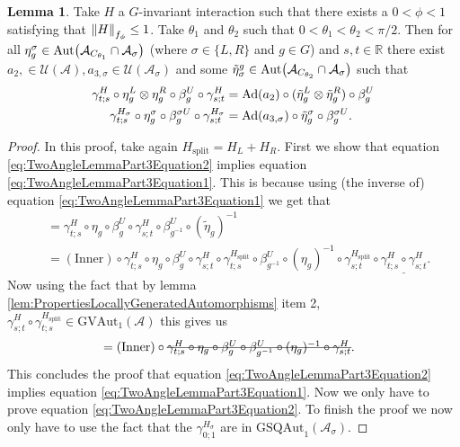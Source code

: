 \documentclass[12pt,a4paper,twoside]{article}
\newcommand{\stkout}[1]{\ifmmode\text{\sout{\ensuremath{#1}}}\else\sout{#1}\fi}
\newcommand{\Hsplit}{{H_{\text{split}}}}
\let\originalleft\left
\let\originalright\right
\renewcommand{\left}{\mathopen{}\mathclose\bgroup\originalleft}
\renewcommand{\right}{\aftergroup\egroup\originalright}
\newcommand{\UU}{\mathcal U}
\renewcommand{\AA}{\mathcal A}
\newcommand{\RR}{\mathbb R}
\newcommand{\Ad}[1]{\textrm{Ad}\left(#1\right)}
\newcommand{\Aut}[1]{\textrm{Aut}\left(#1\right)}
\theoremstyle{definition}
\newtheorem{lemma}[theorem]{Lemma}
\numberwithin{equation}{section}
\begin{document}
\begin{lemma}\label{lem:TwoAngleLemmaPart3}
	Take $H$ a $G$-invariant interaction such that there exists a $0<\phi<1$ satisfying that $\norm{H}_{f_\phi}\leq 1$. Take $\theta_1$ and $\theta_2$ such that $0<\theta_1<\theta_2<\pi/2$. Then for all $\eta_{g}^{\sigma}\in\Aut{\AA_{C_{\theta_1}}\cap\AA_{\sigma}}$ (where $\sigma\in\{L,R\}$ and $g\in G$) and $s,t\in\RR$ there exist $a_{2},\in\UU(\AA),a_{3,\sigma}\in\UU(\AA_\sigma)$ and some $\tilde{\eta}_{\sigma}^g\in \Aut{\AA_{C_{\theta_2}}\cap\AA_{\sigma}}$ such that
	\begin{align}
		\label{eq:TwoAngleLemmaPart3Equation1}
		\gamma^{H}_{t;s}\circ\eta_{g}^L\otimes\eta_{g}^R\circ\beta_g^U\circ\gamma^{H}_{s;t}&=\Ad{a_2}\circ(\tilde\eta_{g}^L \otimes\tilde\eta_{g}^R)\circ\beta_g^U\\
		\label{eq:TwoAngleLemmaPart3Equation2}
		\gamma^{H_\sigma}_{t;s}\circ\eta_g^\sigma\circ\beta_g^{\sigma U}\circ\gamma^{H_\sigma}_{s;t}&=\Ad{a_{3,\sigma}}\circ \tilde\eta_{g}^\sigma\circ\beta_g^{\sigma U}.
	\end{align}
\end{lemma}
\begin{proof}
	In this proof, take again $H_{\text{split}}=H_L+H_R$. First we show that equation \eqref{eq:TwoAngleLemmaPart3Equation2} implies equation \eqref{eq:TwoAngleLemmaPart3Equation1}. This is because using (the inverse of) equation \eqref{eq:TwoAngleLemmaPart3Equation1} we get that
	\begin{align}
		&=\gamma^H_{t;s}\circ\eta_g\circ\beta_g^U\circ\gamma^H_{s;t}\circ\beta_{g^{-1}}^U\circ(\tilde{\eta}_g)^{-1}\\
		&=(\text{Inner})\circ \gamma^H_{t;s}\circ\eta_g\circ\beta_g^U\circ\gamma^H_{s;t}\circ\gamma^\Hsplit_{t;s}\circ\beta_{g^{-1}}^U\circ(\eta_g)^{-1}\circ\gamma^\Hsplit_{s;t}\circ\underline{\gamma^H_{t;s}\circ\gamma^H_{s;t}}.
	\end{align}
	Now using the fact that by lemma \ref{lem:PropertiesLocallyGeneratedAutomorphisms} item 2, $\gamma^H_{s;t}\circ\gamma^\Hsplit_{t;s}\in\textrm{GVAut}_1(\AA)$ this gives us
	\begin{align}
		&=(\text{Inner})\circ\stkout{\gamma^H_{t;s}\circ\eta_g\circ\beta_g^U\circ\beta_{g^{-1}}^U\circ(\eta_g)^{-1}\circ\gamma^H_{s;t}}.
	\end{align}
	This concludes the proof that equation \eqref{eq:TwoAngleLemmaPart3Equation2} implies equation \eqref{eq:TwoAngleLemmaPart3Equation1}. Now we only have to prove equation \eqref{eq:TwoAngleLemmaPart3Equation2}. To finish the proof we now only have to use the fact that the $\gamma^{H_\sigma}_{0;1}$ are in $\textrm{GSQAut}_1(\AA_\sigma)$.
\end{proof}
\end{document}
